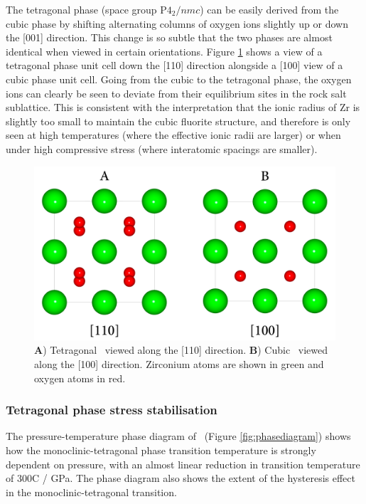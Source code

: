 The tetragonal phase (space group P$4_{2}/nmc$) can be easily derived from the cubic phase by shifting alternating columns of oxygen ions slightly up or down the [001] direction. This change is so subtle that the two phases are almost identical when viewed in certain orientations. Figure \ref{figure:tetvscubic} shows a view of a  tetragonal phase unit cell down the [110] direction alongside a [100] view of a cubic phase unit cell. Going from the cubic to the tetragonal phase, the oxygen ions can clearly be seen to deviate from their equilibrium sites in the rock salt sublattice. This is consistent with the interpretation that the ionic radius of Zr is slightly too small to maintain the cubic fluorite structure, and therefore is only seen at high temperatures (where the effective ionic radii are larger) or when under high compressive stress (where interatomic spacings are smaller).

\begin{figure}[htp]
\centering
\includegraphics[width=14cm]{images/tet_vs_cubic.png}
\caption{\textbf{A}) Tetragonal \zirconia\ viewed along the [110] direction. \textbf{B}) Cubic \zirconia\ viewed along the [100] direction. Zirconium atoms are shown in green and oxygen atoms in red.}
\label{figure:tetvscubic}
\end{figure}

\subsubsection{Tetragonal phase stress stabilisation}

The pressure-temperature phase diagram of \zirconia\ (Figure \ref{fig:phasediagram}) shows how the monoclinic-tetragonal phase transition temperature is strongly dependent on pressure, with an almost linear reduction in transition temperature of 300\textdegree C / GPa. The phase diagram also shows the extent of the hysteresis effect in the monoclinic-tetragonal transition.

